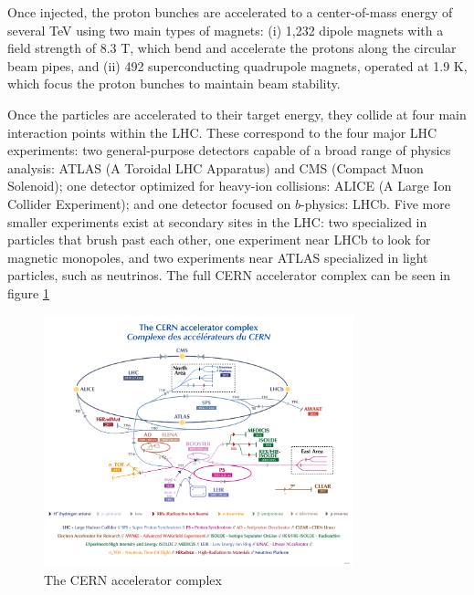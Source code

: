 Once injected, the proton bunches are accelerated to a center-of-mass energy of several TeV using two main types of magnets: (i) 1,232 dipole magnets with a field strength of 8.3 T, which bend and accelerate the protons along the circular beam pipes, and (ii) 492 superconducting quadrupole magnets, operated at 1.9 K, which focus the proton bunches to maintain beam stability.

Once the particles are accelerated to their target energy, they collide at four main interaction points within the LHC. These correspond to the four major LHC experiments: two general-purpose detectors capable of a broad range of physics analysis: ATLAS (A Toroidal LHC Apparatus) and CMS (Compact Muon Solenoid); one detector optimized for heavy-ion collisions: ALICE (A Large Ion Collider Experiment); and one detector focused on $b$-physics: LHCb. Five more smaller experiments exist at secondary sites in the LHC: two specialized in particles that brush past each other, one experiment near LHCb to look for magnetic monopoles, and two experiments near ATLAS specialized in light particles, such as neutrinos. The full CERN accelerator complex can be seen in figure \ref{fig:cern-accelerator-complex}

\begin{figure}[htbp]
    \centering
    \includegraphics[width=0.8\textwidth]{figures/chapter3/CERN-accelerator-complex.png}
    \caption{The CERN accelerator complex \cite{ref:Lopienska}}
    \label{fig:cern-accelerator-complex}
\end{figure}



